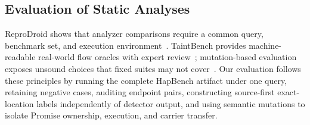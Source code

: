 \subsection{Evaluation of Static Analyses}

ReproDroid shows that analyzer comparisons require a common query, benchmark set, and execution environment~\cite{reprodroid}. TaintBench provides machine-readable real-world flow oracles with expert review~\cite{taintbench}; mutation-based evaluation exposes unsound choices that fixed suites may not cover~\cite{muse}. Our evaluation follows these principles by running the complete HapBench artifact under one query, retaining negative cases, auditing endpoint pairs, constructing source-first exact-location labels independently of detector output, and using semantic mutations to isolate Promise ownership, execution, and carrier transfer.
